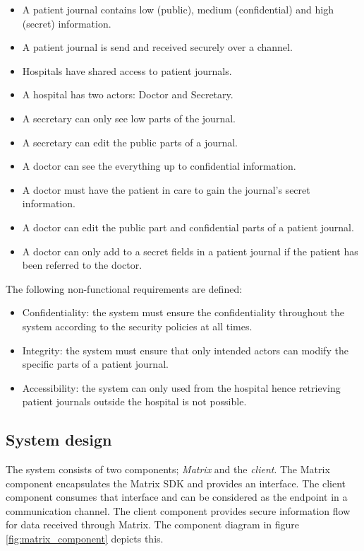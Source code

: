 \begin{itemize}
	\item A patient journal contains low (public), medium (confidential) and high (secret)  information.
	\item A patient journal is send and received securely over a channel.
	\item Hospitals have shared access to patient journals. 
	\item A hospital has two actors: Doctor and Secretary.
	\item A secretary can only see low parts of the journal.
	\item A secretary can edit the public parts of a journal.
	\item A doctor can see the everything up to confidential information.
	\item A doctor must have the patient in care to gain the journal's secret information.
	\item A doctor can edit the public part and confidential parts of a patient journal.
	\item A doctor can only add to a secret fields in a patient journal if the patient has been referred to the doctor.
\end{itemize}

The following non-functional requirements are defined:

\begin{itemize}
	\item Confidentiality: the system must ensure the confidentiality throughout the system according to the security policies at all times.
	\item Integrity: the system must ensure that only intended actors can modify the specific parts of a patient journal.
	\item Accessibility: the system can only used from the hospital hence retrieving patient journals outside the hospital is not possible.
\end{itemize}


\subsection{System design} \label{systemdesign}


The system consists of two components; \emph{Matrix} and the \emph{client}. The Matrix component encapsulates the Matrix SDK and provides an interface. The client component consumes that interface and can be considered as the endpoint in a communication channel. The client component provides secure information flow for data received through Matrix. 
The component diagram in figure \ref{fig:matrix_component} depicts this.

